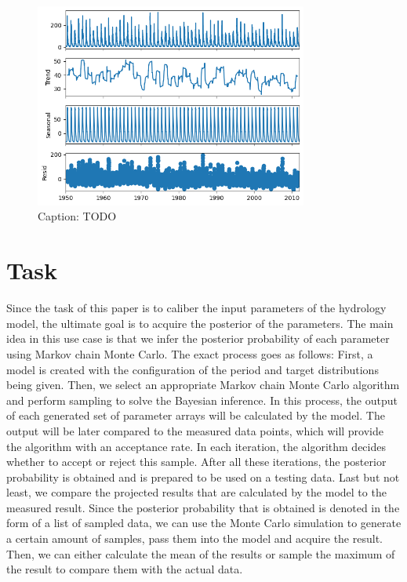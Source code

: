\begin{figure}
    \centering
    \includegraphics[width=0.8\textwidth]{figures/dataset_time_series/Banff.png}
    \captionsetup{width=.8\textwidth}
    \caption{Caption: TODO}
    \label{fig:enter-label}
\end{figure}

\section{Task}
Since the task of this paper is to caliber the input parameters of the hydrology model, the ultimate goal is to acquire the posterior of the parameters. The main idea in this use case is that we infer the posterior probability of each parameter using Markov chain Monte Carlo. The exact process goes as follows: First, a model is created with the configuration of the period and target distributions being given. Then, we select an appropriate Markov chain Monte Carlo algorithm and perform sampling to solve the Bayesian inference. In this process, the output of each generated set of parameter arrays will be calculated by the model. The output will be later compared to the measured data points, which will provide the algorithm with an acceptance rate. In each iteration, the algorithm decides whether to accept or reject this sample. After all these iterations, the posterior probability is obtained and is prepared to be used on a testing data. Last but not least, we compare the projected results that are calculated by the model to the measured result. Since the posterior probability that is obtained is denoted in the form of a list of sampled data, we can use the Monte Carlo simulation to generate a certain amount of samples, pass them into the model and acquire the result. Then, we can either calculate the mean of the results or sample the maximum of the result to compare them with the actual data.


